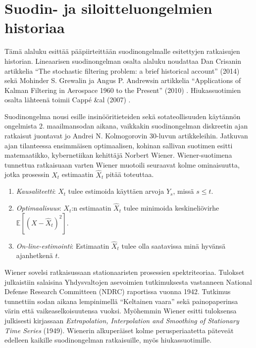 \documentclass[
  12pt,
  a4paper, twoside]{book}
\begin{document}
\section{Suodin- ja siloitteluongelmien historiaa}

Tämä alaluku esittää pääpiirteittään suodinongelmalle esitettyjen ratkaisujen historian. Lineaarisen suodinongelman osalta alaluku noudattaa Dan Crisanin artikkelia ``The stochastic filtering problem: a brief historical account'' (2014) \citep{crisan-2014} sekä Mohinder S. Grewalin ja Angus P. Andrewsin artikkelia ``Applications of Kalman Filtering in Aerospace 1960 to the Present'' (2010) \citep{Grewal-2010}. Hiukassuotimien osalta lähteenä toimii Cappé \&al (2007) \citep{cappe-2007}.

Suodinongelma nousi esille insinööritieteiden sekä sotateollisuuden käytännön ongelmista 2. maailmansodan aikana, vaikkakin suodinongelman diskreetin ajan ratkaisut juontavat jo Andrei N. Kolmogorovin 30-luvun artikkeleihin. Jatkuvan ajan tilanteessa ensimmäisen optimaalisen, kohinan sallivan suotimen esitti matemaatikko, kybernetiikan kehittäjä Norbert Wiener. Wiener-suotimena tunnettua ratkaisuaan varten Wiener muotoili seuraavat kolme ominaisuutta, jotka prosessin \(X_t\) estimaatin \(\hat{X}_t\) pitää toteuttaa.

\begin{enumerate}
\vspace{\baselineskip}
\item \textit{Kausaliteetti}: $X_t$ tulee estimoida käyttäen arvoja $Y_s$, missä $s \leq t$.
\item \textit{Optimaalisuus}: $X_t$:n estimaatin $\hat{X}_t$ tulee minimoida keskineliövirhe $\mathbb{E}[(X-\hat{X}_t)^2]$.
\item \textit{On-line-estimointi}: Estimaatin $\hat{X}_t$ tulee olla saatavissa minä hyvänsä ajanhetkenä $t$. 
\vspace{\baselineskip}
\end{enumerate}

Wiener sovelsi ratkaisussaan stationaaristen prosessien spektriteoriaa. Tulokset julkaistiin salaisina Yhdysvaltojen asevoimien tutkimuksesta vastanneen National Defense Research Committeen (NDRC) raportissa vuonna 1942. Tutkimus tunnettiin sodan aikana lempinimellä ``Keltainen vaara'' sekä painopaperinsa värin että vaikeaselkoisuutensa vuoksi. Myöhemmin Wiener esitti tuloksensa julkisesti kirjassaan \textit{Extrapolation, Interpolation and Smoothing of Stationary Time Series} (1949). Wienerin alkuperäiset kolme perusperiaatetta päteveät edelleen kaikille suodinongelman ratkaisuille, myös hiukassuotimille.
\end{document}

